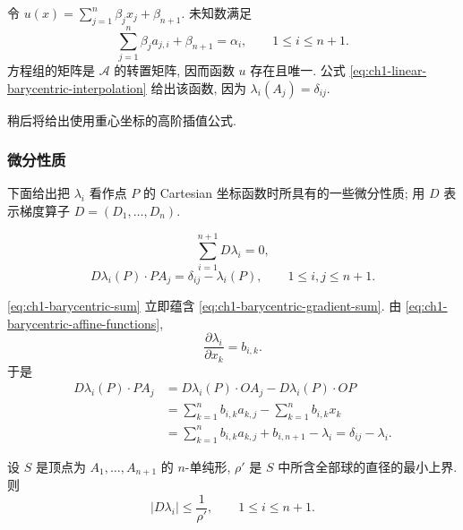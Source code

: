 \begin{Proof}
令 $u(x)=\sum_{j=1}^n\beta_jx_j+\beta_{n+1}$. 未知数满足
\[
\sum_{j=1}^n\beta_ja_{j,i}+\beta_{n+1}=\alpha_i,
\qquad1\leq i\leq n+1.
\]
方程组的矩阵是 $\mathcal A$ 的转置矩阵, 因而函数 $u$ 存在且唯一. 公式 \eqref{eq:ch1-linear-barycentric-interpolation} 给出该函数, 因为 $\lambda_i(A_j)=\delta_{ij}$.
\end{Proof}

\begin{Remark}
\label{rem:ch1-higher-order-barycentric-interpolation}
稍后将给出使用重心坐标的高阶插值公式.
\end{Remark}

\subsubsection*{微分性质}

下面给出把 $\lambda_i$ 看作点 $P$ 的 Cartesian 坐标函数时所具有的一些微分性质; 用 $D$ 表示梯度算子 $D=(D_1,\ldots,D_n)$.

\begin{Lemma}
\label{lem:ch1-barycentric-differential-identities}
\begin{equation}
\sum_{i=1}^{n+1}D\lambda_i=0,
\label{eq:ch1-barycentric-gradient-sum}
\end{equation}
\begin{equation}
D\lambda_i(P)\cdot PA_j=\delta_{ij}-\lambda_i(P),
\qquad1\leq i,j\leq n+1.
\label{eq:ch1-barycentric-gradient-vector}
\end{equation}
\end{Lemma}

\begin{Proof}
\eqref{eq:ch1-barycentric-sum} 立即蕴含 \eqref{eq:ch1-barycentric-gradient-sum}. 由 \eqref{eq:ch1-barycentric-affine-functions},
\[
\frac{\partial\lambda_i}{\partial x_k}=b_{i,k}.
\]
于是
\[
\begin{aligned}
D\lambda_i(P)\cdot PA_j
&=D\lambda_i(P)\cdot OA_j-D\lambda_i(P)\cdot OP\\
&=\sum_{k=1}^nb_{i,k}a_{k,j}-\sum_{k=1}^nb_{i,k}x_k\\
&=\sum_{k=1}^nb_{i,k}a_{k,j}+b_{i,n+1}-\lambda_i
=\delta_{ij}-\lambda_i.
\end{aligned}
\]
\end{Proof}

\begin{Lemma}
\label{lem:ch1-barycentric-gradient-bound}
设 $S$ 是顶点为 $A_1,\ldots,A_{n+1}$ 的 $n$-单纯形, $\rho'$ 是 $S$ 中所含全部球的直径的最小上界. 则
\begin{equation}
|D\lambda_i|\leq\frac1{\rho'},
\qquad1\leq i\leq n+1.
\label{eq:ch1-barycentric-gradient-bound}
\end{equation}
\end{Lemma}

